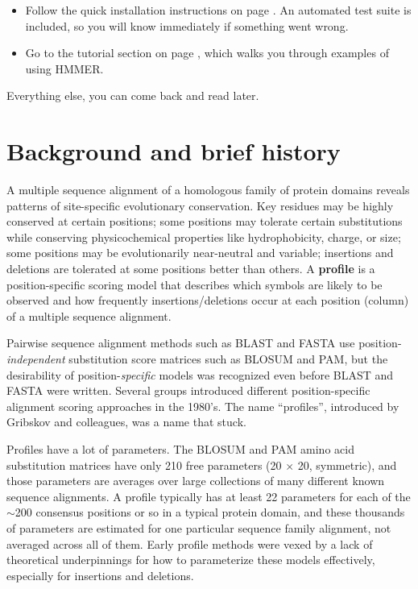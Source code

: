 \begin{itemize}

\item Follow the quick installation instructions on page
  \pageref{chapter:installation}. An automated test suite is included,
  so you will know immediately if something went
  wrong.

\item Go to the tutorial section on page \pageref{chapter:tutorial},
  which walks you through examples of using HMMER.

\end{itemize}

Everything else, you can come back and read later.



\section{Background and brief history}

A multiple sequence alignment of a homologous family of protein
domains reveals patterns of site-specific evolutionary
conservation. Key residues may be highly conserved at certain
positions; some positions may tolerate certain substitutions while
conserving physicochemical properties like hydrophobicity, charge, or
size; some positions may be evolutionarily near-neutral and variable;
insertions and deletions are tolerated at some positions better than
others.  A \textbf{profile} is a position-specific scoring model that
describes which symbols are likely to be observed and how frequently
insertions/deletions occur at each position (column) of a
multiple sequence alignment.

Pairwise sequence alignment methods such as BLAST and FASTA use
position-\emph{independent} substitution score matrices such as BLOSUM
and PAM, but the desirability of position-\emph{specific} models was
recognized even before BLAST and FASTA were written.\cite{Doolittle81}
Several groups introduced different position-specific alignment
scoring approaches in the 1980's. The name ``profiles'', introduced by
Gribskov and colleagues,\cite{Gribskov87} was a name that stuck.

Profiles have a lot of parameters.  The BLOSUM and PAM amino acid
substitution matrices have only 210 free parameters (20 $\times$ 20,
symmetric), and those parameters are averages over large collections
of many different known sequence alignments. A profile typically has
at least 22 parameters  for each of the $\sim$200 consensus positions or so in a
typical protein domain, and these thousands of parameters are
estimated for one particular sequence family alignment, not averaged
across all of them. Early profile methods were vexed by a lack of
theoretical underpinnings for how to parameterize these models
effectively, especially for insertions and deletions.

